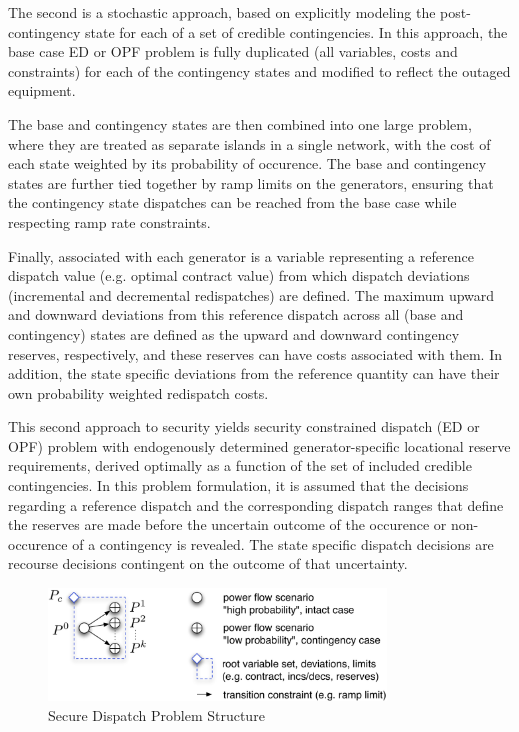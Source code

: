 \documentclass[12pt]{article}
\numberwithin{equation}{section}
\numberwithin{table}{section}
\numberwithin{figure}{section}
\begin{document}
The second is a stochastic approach, based on explicitly modeling the post-contingency state for each of a set of credible contingencies. In this approach, the base case ED or OPF problem is fully duplicated (all variables, costs and constraints) for each of the contingency states and modified to reflect the outaged equipment.

The base and contingency states are then combined into one large problem, where they are treated as separate islands in a single network, with the cost of each state weighted by its probability of occurence. The base and contingency states are further tied together by ramp limits on the generators, ensuring that the contingency state dispatches can be reached from the base case while respecting ramp rate constraints.

Finally, associated with each generator is a variable representing a reference dispatch value (e.g. optimal contract value) from which dispatch deviations (incremental and decremental redispatches) are defined. The maximum upward and downward deviations from this reference dispatch across all (base and contingency) states are defined as the upward and downward contingency reserves, respectively, and these reserves can have costs associated with them. In addition, the state specific deviations from the reference quantity can have their own probability weighted redispatch costs.

This second approach to security yields security constrained dispatch (ED or OPF) problem with endogenously determined generator-specific locational reserve requirements, derived optimally as a function of the set of included credible contingencies. In this problem formulation, it is assumed that the decisions regarding a reference dispatch and the corresponding dispatch ranges that define the reserves are made before the uncertain outcome of the occurence or non-occurence of a contingency is revealed. The state specific dispatch decisions are recourse decisions contingent on the outcome of that uncertainty.

\begin{figure}[hbtp]
  \centering
  \includegraphics[width=0.8\textwidth]{./figures/structure}
  \caption{Secure Dispatch Problem Structure}
  \label{fig:secure_dispatch_structure}
\end{figure}
\end{document}
